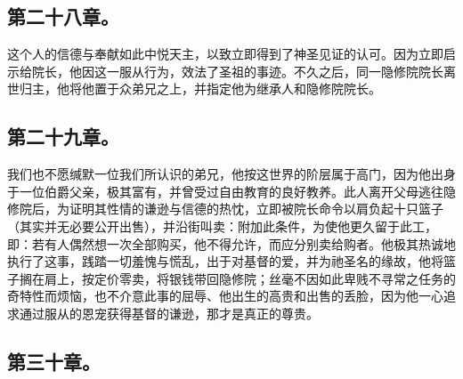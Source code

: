 
\subsection{第二十八章。}

\par

这个人的信德与奉献如此中悦天主，以致立即得到了神圣见证的认可。因为立即启示给院长，他因这一服从行为，效法了圣祖的事迹。不久之后，同一隐修院院长离世归主，他将他置于众弟兄之上，并指定他为继承人和隐修院院长。\par


\subsection{第二十九章。}

\par

我们也不愿缄默一位我们所认识的弟兄，他按这世界的阶层属于高门，因为他出身于一位伯爵父亲，极其富有，并曾受过自由教育的良好教养。此人离开父母逃往隐修院后，为证明其性情的谦逊与信德的热忱，立即被院长命令以肩负起十只篮子（其实并无必要公开出售），并沿街叫卖：附加此条件，为使他更久留于此工，即：若有人偶然想一次全部购买，他不得允许，而应分别卖给购者。他极其热诚地执行了这事，践踏一切羞愧与慌乱，出于对基督的爱，并为祂圣名的缘故，他将篮子搁在肩上，按定价零卖，将银钱带回隐修院；丝毫不因如此卑贱不寻常之任务的奇特性而烦恼，也不介意此事的屈辱、他出生的高贵和出售的丢脸，因为他一心追求通过服从的恩宠获得基督的谦逊，那才是真正的尊贵。\par


\subsection{第三十章。}

\par

